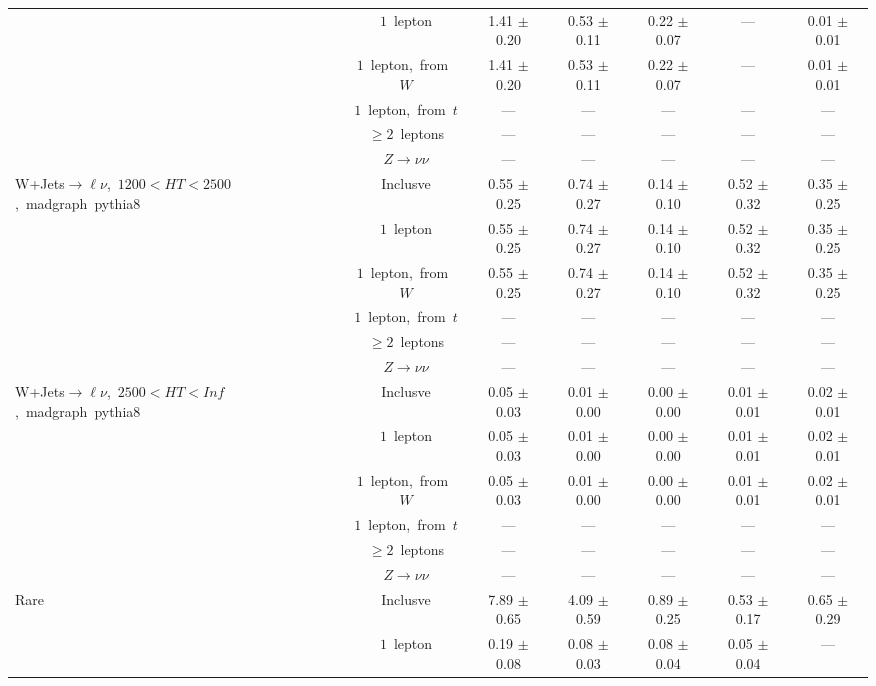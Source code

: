 \documentclass{article}
\begin{document}
\begin{longtable}{|l|c|c|c|c|c|c|}
 & $1$~lepton  & 1.41 $\pm$ 0.20  & 0.53 $\pm$ 0.11  & 0.22 $\pm$ 0.07  & ---  & 0.01 $\pm$ 0.01 \\* 
 & $1$~lepton,~from~$W$  & 1.41 $\pm$ 0.20  & 0.53 $\pm$ 0.11  & 0.22 $\pm$ 0.07  & ---  & 0.01 $\pm$ 0.01 \\* 
 & $1$~lepton,~from~$t$  & ---  & ---  & ---  & ---  & --- \\* 
 & $\ge2$~leptons  & ---  & ---  & ---  & ---  & --- \\* 
 & $Z\rightarrow\nu\nu$  & ---  & ---  & ---  & ---  & --- \\* 
\hline 
\multirow{6}{*}{W+Jets$\rightarrow\ell\nu$,~$1200<HT<2500$,~madgraph~pythia8} & Inclusve  & 0.55 $\pm$ 0.25  & 0.74 $\pm$ 0.27  & 0.14 $\pm$ 0.10  & 0.52 $\pm$ 0.32  & 0.35 $\pm$ 0.25 \\* 
 & $1$~lepton  & 0.55 $\pm$ 0.25  & 0.74 $\pm$ 0.27  & 0.14 $\pm$ 0.10  & 0.52 $\pm$ 0.32  & 0.35 $\pm$ 0.25 \\* 
 & $1$~lepton,~from~$W$  & 0.55 $\pm$ 0.25  & 0.74 $\pm$ 0.27  & 0.14 $\pm$ 0.10  & 0.52 $\pm$ 0.32  & 0.35 $\pm$ 0.25 \\* 
 & $1$~lepton,~from~$t$  & ---  & ---  & ---  & ---  & --- \\* 
 & $\ge2$~leptons  & ---  & ---  & ---  & ---  & --- \\* 
 & $Z\rightarrow\nu\nu$  & ---  & ---  & ---  & ---  & --- \\* 
\hline 
\multirow{6}{*}{W+Jets$\rightarrow\ell\nu$,~$2500<HT<Inf$,~madgraph~pythia8} & Inclusve  & 0.05 $\pm$ 0.03  & 0.01 $\pm$ 0.00  & 0.00 $\pm$ 0.00  & 0.01 $\pm$ 0.01  & 0.02 $\pm$ 0.01 \\* 
 & $1$~lepton  & 0.05 $\pm$ 0.03  & 0.01 $\pm$ 0.00  & 0.00 $\pm$ 0.00  & 0.01 $\pm$ 0.01  & 0.02 $\pm$ 0.01 \\* 
 & $1$~lepton,~from~$W$  & 0.05 $\pm$ 0.03  & 0.01 $\pm$ 0.00  & 0.00 $\pm$ 0.00  & 0.01 $\pm$ 0.01  & 0.02 $\pm$ 0.01 \\* 
 & $1$~lepton,~from~$t$  & ---  & ---  & ---  & ---  & --- \\* 
 & $\ge2$~leptons  & ---  & ---  & ---  & ---  & --- \\* 
 & $Z\rightarrow\nu\nu$  & ---  & ---  & ---  & ---  & --- \\* 
\hline 
\multirow{6}{*}{Rare} & Inclusve  & 7.89 $\pm$ 0.65  & 4.09 $\pm$ 0.59  & 0.89 $\pm$ 0.25  & 0.53 $\pm$ 0.17  & 0.65 $\pm$ 0.29 \\* 
 & $1$~lepton  & 0.19 $\pm$ 0.08  & 0.08 $\pm$ 0.03  & 0.08 $\pm$ 0.04  & 0.05 $\pm$ 0.04  & --- \\* 

\end{longtable}
\end{document}
